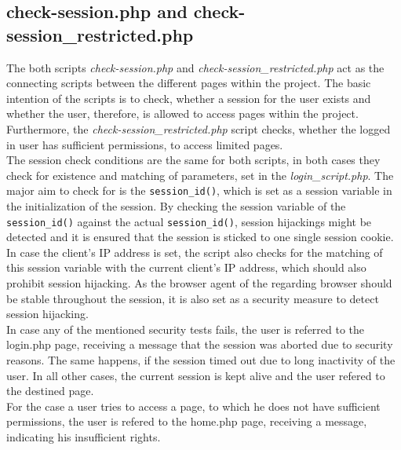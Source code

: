 \subsection{check-session.php and check-session\_restricted.php}
The both scripts \emph{check-session.php} and \emph{check-session\_restricted.php} act as the connecting scripts between the different pages within the project. The basic intention of the scripts is 
to check, whether a session for the user exists and whether the user, therefore, is allowed to access pages within the project. Furthermore, the \emph{check-session\_restricted.php} script checks,
whether the logged in user has sufficient permissions, to access limited pages.\\ 
The session check conditions are the same for both scripts, in both cases they check for existence and matching of parameters, set in the \emph{login\_script.php}. The major aim to check for is the 
\texttt{session\_id()}, which is set as a session variable in the initialization of the session. By checking the session variable of the \texttt{session\_id()} against the actual \texttt{session\_id()}, 
session hijackings might be detected and it is ensured that the session is sticked to one single session cookie. In case the client's IP address is set, the script also checks for the matching of this 
session variable with the current client's IP address, which should also prohibit session hijacking. As the browser agent of the regarding browser should be stable throughout the session, it is also 
set as a security measure to detect session hijacking.\\
In case any of the mentioned security tests fails, the user is referred to the login.php page, receiving a message that the session was aborted due to security reasons. The same happens, if the session 
timed out due to long inactivity of the user. In all other cases, the current session is kept alive and the user refered to the destined page.\\
For the case a user tries to access a page, to which he does not have sufficient permissions, the user is refered to the home.php page, receiving a message, indicating his insufficient rights.
